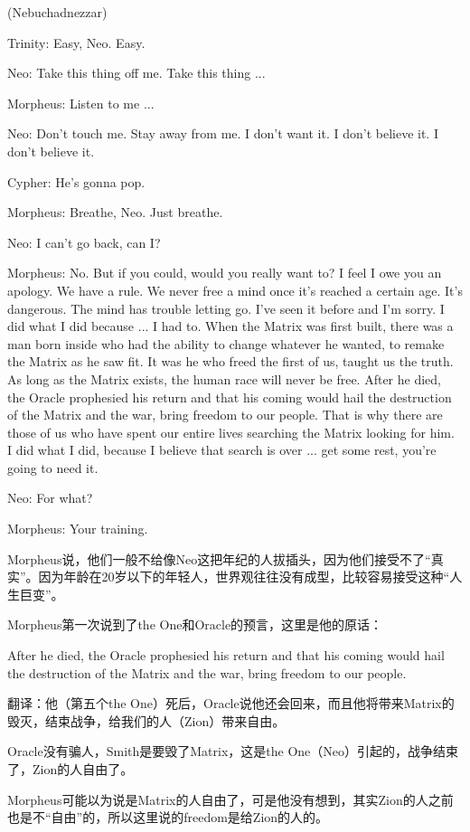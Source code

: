 \documentclass{ctexart}
\newenvironment{myquote}{\color{green} \setlength{\leftskip}{6em} \setlength{\rightskip}{4em} \setlength{\parindent}{-2em}}{\par}
\begin{document}
\begin{myquote}
(Nebuchadnezzar)

Trinity: Easy, Neo. Easy.

Neo: Take this thing off me. Take this thing ...

Morpheus: Listen to me ...

Neo: Don't touch me. Stay away from me. I don't want it. I don't believe it. I don't believe it.

Cypher: He's gonna pop.

Morpheus: Breathe, Neo. Just breathe.

Neo: I can't go back, can I?

Morpheus: No. But if you could, would you really want to? I feel I owe you an apology. We have a rule. We never free a mind once it's reached a certain age. It's dangerous. The mind has trouble letting go. I've seen it before and I'm sorry. I did what I did because ... I had to. When the Matrix was first built, there was a man born inside who had the ability to change whatever he wanted, to remake the Matrix as he saw fit. It was he who freed the first of us, taught us the truth. As long as the Matrix exists, the human race will never be free. After he died, the Oracle prophesied his return and that his coming would hail the destruction of the Matrix and the war, bring freedom to our people. That is why there are those of us who have spent our entire lives searching the Matrix looking for him. I did what I did, because I believe that search is over ... get some rest, you're going to need it.

Neo: For what?

Morpheus: Your training.
\end{myquote}

Morpheus说，他们一般不给像Neo这把年纪的人拔插头，因为他们接受不了“真实”。因为年龄在20岁以下的年轻人，世界观往往没有成型，比较容易接受这种“人生巨变”。

Morpheus第一次说到了the One和Oracle的预言，这里是他的原话：

After he died, the Oracle prophesied his return and that his coming would hail the destruction of the Matrix and the war, bring freedom to our people.

翻译：他（第五个the One）死后，Oracle说他还会回来，而且他将带来Matrix的毁灭，结束战争，给我们的人（Zion）带来自由。

Oracle没有骗人，Smith是要毁了Matrix，这是the One（Neo）引起的，战争结束了，Zion的人自由了。

Morpheus可能以为说是Matrix的人自由了，可是他没有想到，其实Zion的人之前也是不“自由”的，所以这里说的freedom是给Zion的人的。
\end{document}
